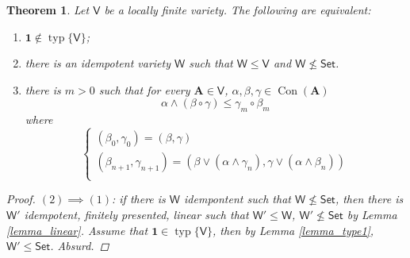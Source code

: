 \documentclass{amsart}
\theoremstyle{plain}
\newtheorem{theorem}{Theorem}[section]
\theoremstyle{definition}
\theoremstyle{remark}
\DeclareMathOperator{\Con}{Con}
\DeclareMathOperator{\typ}{typ}
\begin{document}
\begin{theorem}
    \label{omitting_typ1}
    Let $\mathsf{V}$ be a locally finite variety. 
    The following are equivalent: 
    \begin{enumerate}
        \item $\mathbf{1} \notin \typ\{\mathsf{V}\}$; 
        \item there is an idempotent variety $\mathsf{W}$ such that $\mathsf{W} \le \mathsf{V}$ and $\mathsf{W} \nleq \mathsf{Set}$. 
        \item there is $m > 0$ such that for every $\mathbf{A} \in \mathsf{V}$, $\alpha, \beta, \gamma \in \Con(\mathbf{A})$ 
        \begin{equation*}
            \alpha \land (\beta \circ \gamma) \le \gamma_m \circ \beta_m 
        \end{equation*}
        where 
        \begin{equation*}
        \begin{cases}
            (\beta_0, \gamma_0) = (\beta, \gamma) \\
            (\beta_{n+1}, \gamma_{n+1})  = (\beta \lor (\alpha \land \gamma_n), \gamma \lor (\alpha \land \beta_n)) \\
        \end{cases}
    \end{equation*}
    \end{enumerate}
    \begin{proof}
        $(2) \implies (1)$: if there is $\mathsf{W}$ idempontent such that $\mathsf{W} \nleq \mathsf{Set}$, 
        then there is $\mathsf{W}'$ idempotent, finitely presented, linear such that $\mathsf{W}' \le \mathsf{W}$, $\mathsf{W}' \nleq \mathsf{Set}$ by Lemma \ref{lemma_linear}. 
        Assume that $\mathbf{1} \in \typ\{\mathsf{V}\}$, then by Lemma \ref{lemma_type1}, $\mathsf{W}' \le \mathsf{Set}$.
        Absurd.  


\end{proof}
\end{theorem}
\end{document}
